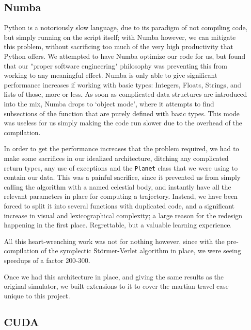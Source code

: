 \subsection{Numba}

Python is a notoriously slow language, due to its paradigm of not compiling code, but simply running on the script itself; with Numba however, we can mitigate this problem, without sacrificing too much of the very high productivity that Python offers. We attempted to have Numba optimize our code for us, but found that our "proper software engineering" philosophy was preventing this from working to any meaningful effect. Numba is only able to give significant performance increases if working with basic types: Integers, Floats, Strings, and lists of those, more or less. As soon as complicated data structures are introduced into the mix, Numba drops to `object mode', where it attempts to find subsections of the function that are purely defined with basic types. This mode was useless for us simply making the code run slower due to the overhead of the compilation.

In order to get the performance increases that the problem required, we had to make some sacrifices in our idealized architecture, ditching any complicated return types, any use of exceptions and the \texttt{Planet} class that we were using to contain our data. This was a painful sacrifice, since it prevented us from simply calling the algorithm with a named celestial body, and instantly have all the relevant parameters in place for computing a trajectory. Instead, we have been forced to split it into several functions with duplicated code, and a significant increase in visual and lexicographical complexity; a large reason for the redesign happening in the first place. Regrettable, but a valuable learning experience.

All this heart-wrenching work was not for nothing however, since with the pre-compilation of the symplectic Störmer-Verlet algorithm in place, we were seeing speedups of a factor 200-300. 

Once we had this architecture in place, and giving the same results as the original simulator, we built extensions to it to cover the martian travel case unique to this project.

\subsection{CUDA}

